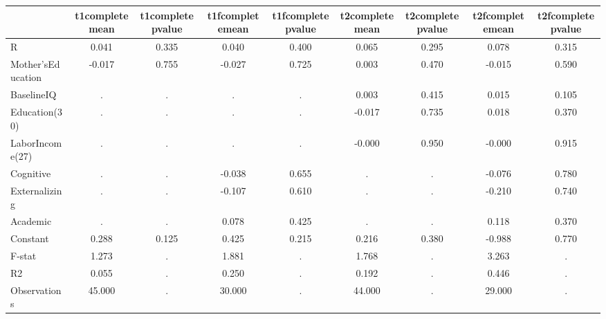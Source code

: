 \begin{table}[htbp]
\begin{tabular}{lcccccccc} \hline \hline
 & t1completemean  & t1completepvalue  & t1fcompletemean  & t1fcompletepvalue  & t2completemean  & t2completepvalue  & t2fcompletemean  & t2fcompletepvalue  \\  \hline 
R &     0.041 &     0.335 &     0.040 &     0.400 &     0.065 &     0.295 &     0.078 &     0.315 \\  
Mother'sEducation &    -0.017 &     0.755 &    -0.027 &     0.725 &     0.003 &     0.470 &    -0.015 &     0.590 \\  
BaselineIQ &         . &         . &         . &         . &     0.003 &     0.415 &     0.015 &     0.105 \\  
Education(30) &         . &         . &         . &         . &    -0.017 &     0.735 &     0.018 &     0.370 \\  
LaborIncome(27) &         . &         . &         . &         . &    -0.000 &     0.950 &    -0.000 &     0.915 \\  
Cognitive &         . &         . &    -0.038 &     0.655 &         . &         . &    -0.076 &     0.780 \\  
Externalizing &         . &         . &    -0.107 &     0.610 &         . &         . &    -0.210 &     0.740 \\  
Academic &         . &         . &     0.078 &     0.425 &         . &         . &     0.118 &     0.370 \\  
Constant &     0.288 &     0.125 &     0.425 &     0.215 &     0.216 &     0.380 &    -0.988 &     0.770 \\  
F-stat &     1.273 &         . &     1.881 &         . &     1.768 &         . &     3.263 &         . \\  
R2 &     0.055 &         . &     0.250 &         . &     0.192 &         . &     0.446 &         . \\  
Observations &    45.000 &         . &    30.000 &         . &    44.000 &         . &    29.000 &         . \\  
\hline \hline \end{tabular}
\end{table}
